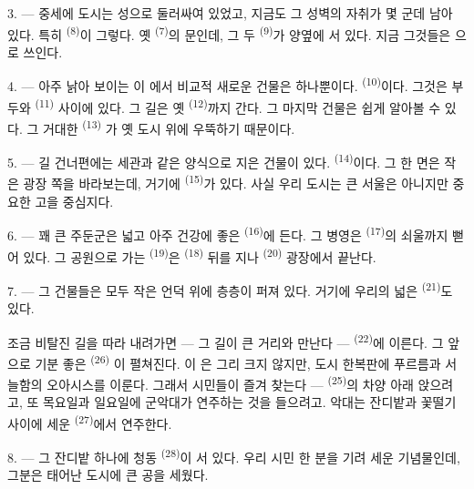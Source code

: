 3. --- 중세에 도시는 성으로 둘러싸여 있었고, 지금도 그 성벽의 자취가 몇 군데 남아 있다.
특히  \textsuperscript{(8)}이 그렇다. 옛  \textsuperscript{(7)}의
문인데, 그 두  \textsuperscript{(9)}가 양옆에 서 있다. 지금 그것들은
으로 쓰인다.

4. --- 아주 낡아 보이는 이 에서 비교적 새로운 건물은 하나뿐이다.
 \textsuperscript{(10)}이다. 그것은 부두와 
\textsuperscript{(11)} 사이에 있다. 그 길은 옛  \textsuperscript{(12)}까지
간다. 그 마지막 건물은 쉽게 알아볼 수 있다. 그 거대한  \textsuperscript{(13)}
가 옛 도시 위에 우뚝하기 때문이다.

5. --- 길 건너편에는 세관과 같은 양식으로 지은 건물이  있다.
 \textsuperscript{(14)}이다. 그 한 면은 작은 광장 쪽을 바라보는데,
거기에  \textsuperscript{(15)}가 있다. 사실 우리 도시는 큰 서울은
아니지만 중요한 고을 중심지다.

\VUsaut{5.0mm}
\VUsaut{3.4mm}

6. --- 꽤 큰 주둔군은 넓고 아주 건강에 좋은  \textsuperscript{(16)}에 든다.
그 병영은  \textsuperscript{(17)}의 쇠울까지 뻗어 있다. 그 공원으로 가는
 \textsuperscript{(19)}은  \textsuperscript{(18)} 뒤를
지나  \textsuperscript{(20)} 광장에서 끝난다.

7. --- 그 건물들은 모두 작은 언덕 위에 층층이 퍼져 있다. 거기에 우리의 넓은
 \textsuperscript{(21)}도 있다.

조금 비탈진 길을 따라 내려가면 — 그 길이 큰 거리와 만난다 — 
\textsuperscript{(22)}에 이른다. 그 앞으로 기분 좋은  \textsuperscript{(26)}
이 펼쳐진다. 이 은 그리 크지 않지만, 도시 한복판에 푸르름과 서늘함의
오아시스를 이룬다. 그래서 시민들이 즐겨 찾는다 —  \textsuperscript{(25)}의
차양 아래 앉으려고, 또 목요일과 일요일에 군악대가 연주하는 것을 들으려고. 악대는 잔디밭과
꽃떨기 사이에 세운  \textsuperscript{(27)}에서 연주한다.

8. --- 그 잔디밭 하나에 청동  \textsuperscript{(28)}이 서 있다. 우리
시민 한 분을 기려 세운 기념물인데, 그분은 태어난 도시에 큰 공을 세웠다.

\VUsaut{5.0mm}
\VUsaut{3.4mm}

